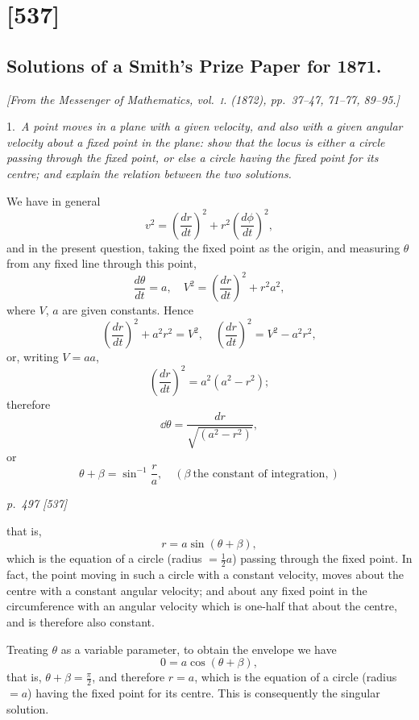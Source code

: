 \documentclass[11pt,a4paper]{book}
\begin{document}
\section{[537]}
\subsection{Solutions of a Smith's Prize Paper for 1871.}

\begin{center}
\textit{[From the Messenger of Mathematics, vol.~\textsc{i}. (1872), pp.~37--47, 71--77, 89--95.]}
\end{center}

\noindent\textsc{1.}\, \textit{A point moves in a plane with a given velocity, and also with a given angular
velocity about a fixed point in the plane: show that the locus is either a circle passing through
the fixed point, or else a circle having the fixed point for its centre; and explain the
relation between the two solutions.}

We have in general
\[
v^2 = \left(\frac{dr}{dt}\right)^2 + r^2\left(\frac{d\phi}{dt}\right)^2,
\]
and in the present question, taking the fixed point as the origin, and measuring $\theta$
from any fixed line through this point,
\[
\frac{d\theta}{dt} = a, \quad V^2 = \left(\frac{dr}{dt}\right)^2 + r^2 a^2,
\]
where $V$, $a$ are given constants. Hence
\[
\left(\frac{dr}{dt}\right)^2 + a^2 r^2 = V^2, \quad \left(\frac{dr}{dt}\right)^2 = V^2 - a^2 r^2,
\]
or, writing $V = a a$,
\[
\left(\frac{dr}{dt}\right)^2 = a^2(a^2 - r^2);
\]
therefore
\[
\dd\theta = \frac{dr}{\sqrt{(a^2 - r^2)}},
\]
or
\[
\theta + \beta = \sin^{-1}\frac{r}{a}, \quad (\beta\ \text{the constant of integration},)
\]

\clearpage

\bigskip
\textit{p.~497 [537]}
\smallskip

\noindent
that is,
\[
r = a\sin(\theta + \beta),
\]
which is the equation of a circle (radius $= \frac{1}{2}a$) passing through the fixed point. In
fact, the point moving in such a circle with a constant velocity, moves about the
centre with a constant angular velocity; and about any fixed point in the circumference
with an angular velocity which is one-half that about the centre, and is therefore
also constant.

Treating $\theta$ as a variable parameter, to obtain the envelope we have
\[
0 = a\cos(\theta + \beta),
\]
that is, $\theta + \beta = \frac{\pi}{2}$, and therefore $r = a$, which is the equation of a circle (radius $= a$)
having the fixed point for its centre. This is consequently the singular solution.
\end{document}
